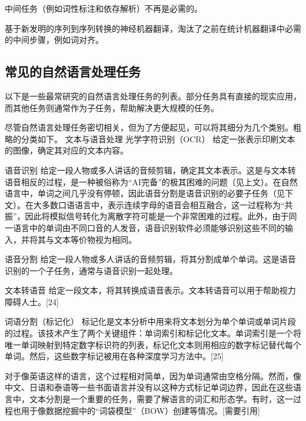 中间任务（例如词性标注和依存解析）不再是必需的。

基于新发明的序列到序列转换的神经机器翻译，淘汰了之前在统计机器翻译中必需的中间步骤，例如词对齐。
\subsection{常见的自然语言处理任务}  
以下是一些最常研究的自然语言处理任务的列表。部分任务具有直接的现实应用，而其他任务则通常作为子任务，帮助解决更大规模的任务。

尽管自然语言处理任务密切相关，但为了方便起见，可以将其细分为几个类别。粗略的分类如下。
文本与语音处理  
光学字符识别（OCR）  
给定一张表示印刷文本的图像，确定其对应的文本内容。

语音识别  
给定一段人物或多人讲话的音频剪辑，确定其文本表示。这是与文本转语音相反的过程，是一种被俗称为“AI完备”的极其困难的问题（见上文）。在自然语言中，单词之间几乎没有停顿，因此语音分割是语音识别的必要子任务（见下文）。在大多数口语语言中，表示连续字母的语音会相互融合，这一过程称为“共振”，因此将模拟信号转化为离散字符可能是一个非常困难的过程。此外，由于同一语言中的单词由不同口音的人发音，语音识别软件必须能够识别这些不同的输入，并将其与文本等价物视为相同。

语音分割  
给定一段人物或多人讲话的音频剪辑，将其分割成单个单词。这是语音识别的一个子任务，通常与语音识别一起处理。

文本转语音  
给定一段文本，将其转换成语音表示。文本转语音可以用于帮助视力障碍人士。[24]

词语分割（标记化）  
标记化是文本分析中用来将文本划分为单个单词或单词片段的过程。该技术产生了两个关键组件：单词索引和标记化文本。单词索引是一个将唯一单词映射到特定数字标识符的列表，标记化文本则用相应的数字标记替代每个单词。然后，这些数字标记被用在各种深度学习方法中。[25]

对于像英语这样的语言，这个过程相对简单，因为单词通常由空格分隔。然而，像中文、日语和泰语等一些书面语言并没有以这种方式标记单词边界，因此在这些语言中，文本分割是一个重要的任务，需要了解语言的词汇和形态学。有时，这一过程也用于像数据挖掘中的“词袋模型”（BOW）创建等情况。[需要引用]